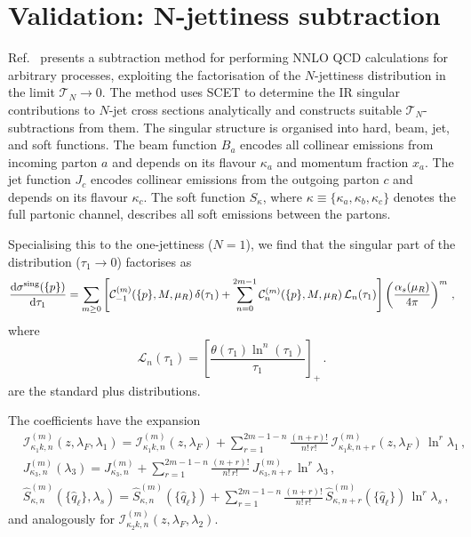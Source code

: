\section{Validation: N-jettiness subtraction}

Ref.~\cite{Gaunt:2015pea} presents a subtraction method for
performing NNLO QCD calculations for arbitrary processes, exploiting
the factorisation of the $N$-jettiness distribution in the limit
$\mathcal{T}_N\to0$. The method uses SCET to determine the IR
singular contributions to $N$-jet cross sections analytically and
constructs suitable $\mathcal{T}_N$-subtractions from them. The
singular structure is organised into hard, beam, jet, and soft
functions. The beam function $B_a$ encodes all collinear emissions
from incoming parton $a$ and depends on its flavour $\kappa_a$ and
momentum fraction $x_a$. The jet function $J_c$ encodes collinear
emissions from the outgoing parton $c$ and depends on its flavour
$\kappa_c$. The soft function $S_\kappa$, where
$\kappa\equiv\{\kappa_a,\kappa_b,\kappa_c\}$ denotes the full
partonic channel, describes all soft emissions between the partons.

Specialising this to the one-jettiness ($N=1$), we find that the singular part of the distribution ($\tau_1\to0$) factorises as 
\begin{equation}
	\label{eq:Cnm-def}
	\frac{\mathrm{d}\sigma^{\rm sing}(\{p\})}{\mathrm{d}\tau_1}
	=\sum_{m\geq0}\left[\mathcal{C}_{-1}^{(m)}(\{p\},M,\mu_R)\,\delta(\tau_1)
	+\sum_{n=0}^{2m-1}\mathcal{C}_n^{(m)}(\{p\},M,\mu_R)\,\mathcal{L}_n(\tau_1)\right]
	\left(\frac{\alpha_s(\mu_R)}{4\pi}\right)^m\,,
\end{equation}
where 
\begin{equation}
	\mathcal{L}_n(\tau_1)=\left[\frac{\theta(\tau_1)\ln^n(\tau_1)}{\tau_1}\right]_+\,.
\end{equation} 
are the standard plus distributions. 

The coefficients have the expansion
\begin{subequations}
\label{eq:subt-mn-exp}
\begin{align}
    &\mathcal{I}_{\kappa_1 k,n}^{(m)}(z,\lambda_F,\lambda_1) =
    \mathcal{I}_{\kappa_1 k,n}^{(m)}(z,\lambda_F)
    + \sum_{r=1}^{2m-1-n}\frac{(n+r)!}{n!\,r!}\,
    \mathcal{I}_{\kappa_1 k,n+r}^{(m)}(z,\lambda_F)\,\ln^r\!\lambda_1\,,\\
    &J_{\kappa_3,n}^{(m)}(\lambda_3) = J_{\kappa_3,n}^{(m)}
    + \sum_{r=1}^{2m-1-n}\frac{(n+r)!}{n!\,r!}\,J_{\kappa_3,n+r}^{(m)}\,\ln^r\!\lambda_3\,, \\
    &\widehat{S}_{\kappa,n}^{(m)}(\{\hat{q}_\ell\},\lambda_s) =
    \widehat{S}_{\kappa,n}^{(m)}(\{\hat{q}_\ell\})
    + \sum_{r=1}^{2m-1-n}\frac{(n+r)!}{n!\,r!}\,
    \widehat{S}_{\kappa,n+r}^{(m)}(\{\hat{q}_\ell\})\,\ln^r\!\lambda_s\,,
\end{align}
\end{subequations}
and analogously for $\mathcal{I}_{\kappa_2 k,n}^{(m)}(z,\lambda_F,\lambda_2)$. 

